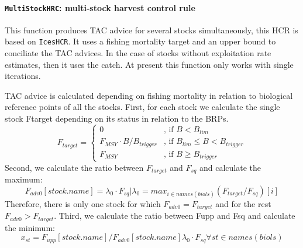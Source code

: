   \paragraph{\texttt{MultiStockHRC}: multi-stock harvest control rule} \hspace{0pt} \smallskip

  This function produces TAC advice for several stocks simultaneously, this HCR is based on \texttt{IcesHCR}. 
  It uses a fishing mortality target and an upper bound to conciliate the TAC advices. In the case of stocks without exploitation rate estimates, then it uses the catch. At present this function only works with single iterations.
  
  
  TAC advice is calculated depending on fishing mortality in relation to biological reference points of all the stocks.
  First, for each stock we calculate the single stock  Ftarget depending on its status in relation to the BRPs.
    \begin{equation}
    	F_{target} =
    	\begin{cases}
  				0                              & \text{, if } B < B_{lim} \\
  				F_{MSY} \cdot  B / B_{trigger} & \text{, if } B_{lim} \leq B < B_{trigger} \\
  				F_{MSY}                        & \text{, if } B \geq B_{trigger}
    	\end{cases}
    \end{equation}
  Second, we calculate the ratio between $F_{target}$ and $F_{sq}$ and calculate the maximum:
    \begin{equation}
    	F_{adv0}[stock.name] = \lambda_0 \cdot F_{sq} | \lambda_0 = max_{i \in names(biols)}(F_{target}/F_{sq})[i]
    \end{equation}
  Therefore, there is only one stock for which $F_{adv0} = F_{target}$ and for the rest $F_{adv0} > F_{target}$.
  Third, we calculate the ratio between Fupp and Fsq and calculate the minimum:
    \begin{equation}
    	x_{st} = F_{upp}[stock.name] /  F_{adv0}[stock.name]\lambda_0 \cdot F_{sq} \forall st \in names(biols)
    \end{equation}
